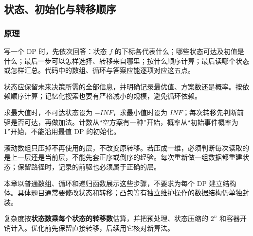 \subsection{状态、初始化与转移顺序}
\label{dp:basics}
\subsubsection*{原理}

写一个 DP 时，先依次回答：状态 $f$ 的下标各代表什么；哪些状态可达及初值是什么；最后一步可以怎样选择、转移来自哪里；按什么顺序计算；最后读哪个状态或怎样汇总。代码中的数组、循环与答案应能逐项对应这五点。

状态应保留未来决策所需的全部信息，并明确记录最优值、方案数还是概率。按依赖顺序计算；记忆化搜索也要有严格减小的规模，避免循环依赖。

求最大值时，不可达状态设为 $-INF$，求最小值时设为 $INF$；每次转移先判断前驱是否可达，再做加法。计数从“空方案有一种”开始，概率从“初始事件概率为 1”开始，不能沿用最值 DP 的初始化。

滚动数组只压掉不再使用的层，不改变原转移。若压成一维，必须判断每次读取的是上一层还是当前层，不能先套正序或倒序的经验。每次重新做一组数据都重建状态；保留路径时，记录的前驱也必须属于正确的层。

本章以普通数组、循环和递归函数展示这些步骤，不要求为每个 DP 建立结构体。具体题目通常要修改状态和转移；凸包等有独立维护操作的数据结构仍单独封装。

复杂度按\textbf{状态数乘每个状态的转移数}估算，并把预处理、状态压缩的 $2^n$ 和容器开销计入。优化前先保留直接转移，后续用它核对新算法。

